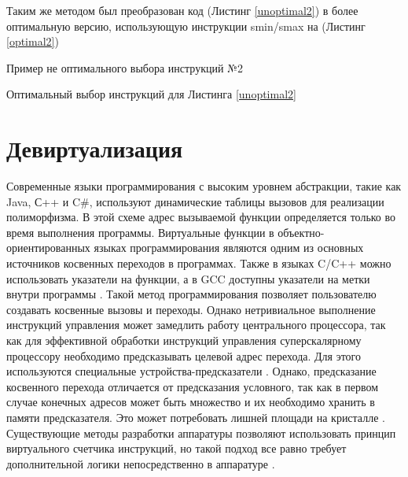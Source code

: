 Таким  же методом был преобразован код  (Листинг \ref{unoptimal2}) в более оптимальную версию, использующую инструкции smin/smax на (Листинг \ref{optimal2})
\begin{ListingEnv}[!h]
	\captiondelim{ } %
	\caption{Пример не оптимального выбора инструкций №2 }\label{unoptimal2}
\end{ListingEnv} 
\begin{ListingEnv}[!h]
	\captiondelim{ } %
	\caption{Оптимальный выбор инструкций для Листинга \ref{unoptimal2} }\label{optimal2}
\end{ListingEnv} 



\section {Девиртуализация} \label{opt:devirt}

Современные языки программирования с высоким уровнем абстракции, такие как Java, С++ и C\#, используют динамические таблицы вызовов для реализации полиморфизма. \cite{calder1994quantifying,suganuma2000overview,bauer2021novt} В этой схеме адрес вызываемой функции определяется только во время выполнения программы. Виртуальные функции в объектно-ориентированных языках программирования являются одним из основных источников косвенных переходов в программах. Также в языках C/C++ можно использовать указатели на функции, а в GCC доступны указатели на метки внутри программы \cite{shah1995function}. Такой метод программирования позволяет пользователю создавать косвенные вызовы и переходы. Однако нетривиальное выполнение инструкций управления может замедлить работу центрального процессора, так как для эффективной обработки инструкций управления суперскалярному процессору необходимо предсказывать целевой адрес перехода. Для этого используются специальные устройства-предсказатели \cite{mcfarling1993combining,mittal2019survey}. Однако, предсказание косвенного перехода отличается от предсказания условного, так как в первом случае конечных адресов может быть множество и их необходимо хранить в памяти предсказателя. Это может потребовать лишней площади на кристалле \cite{driesen1998accurate}. Существующие методы разработки аппаратуры позволяют использовать принцип виртуального счетчика инструкций, но такой подход все равно требует дополнительной логики непосредственно в аппаратуре \cite{redmond2007vpc}.

